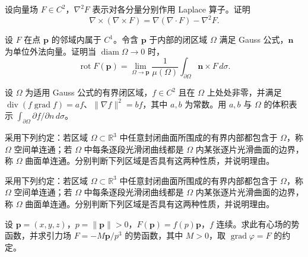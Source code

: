 \noindent\begin{minipage}{\textwidth}
设向量场 $F\in C^2$，$\nabla^2F$ 表示对各分量分别作用 Laplace 算子。证明\[\nabla\times(\nabla\times F)=\nabla(\nabla\cdot F)-\nabla^2F.\]
\end{minipage}\par\vfill
\newpage
\noindent\begin{minipage}{\textwidth}
设 $F$ 在点 $\mathbf p$ 的邻域内属于 $C^1$。令含 $\mathbf p$ 于内部的闭区域 $\Omega$ 满足 Gauss 公式，$\mathbf n$ 为单位外法向量。证明当 $\operatorname{diam}\Omega\to0$ 时，\[\operatorname{rot}F(\mathbf p)=\lim_{\Omega\to\mathbf p}\frac1{\mu(\Omega)}\int_{\partial\Omega}\mathbf n\times F\,d\sigma.\]
\end{minipage}\par\vfill
\noindent\begin{minipage}{\textwidth}
设 $\Omega$ 为适用 Gauss 公式的有界闭区域，$f\in C^2$ 且在 $\Omega$ 上处处非零，并满足 $\operatorname{div}(f\operatorname{grad}f)=af$、$\|\nabla f\|^2=bf$，其中 $a,b$ 为常数。用 $a,b$ 与 $\Omega$ 的体积表示 $\int_{\partial\Omega}\partial f/\partial n\,d\sigma$。
\end{minipage}\par\vfill
\noindent\begin{minipage}{\textwidth}
采用下列约定：若区域 $\Omega\subset\mathbb R^3$ 中任意封闭曲面所围成的有界内部都包含于 $\Omega$，称 $\Omega$ 空间单连通；若 $\Omega$ 中每条逐段光滑闭曲线都是 $\Omega$ 内某张逐片光滑曲面的边界，称 $\Omega$ 曲面单连通。分别判断下列区域是否具有这两种性质，并说明理由。
\end{minipage}\par\vfill
\newpage
\noindent\begin{minipage}{\textwidth}
采用下列约定：若区域 $\Omega\subset\mathbb R^3$ 中任意封闭曲面所围成的有界内部都包含于 $\Omega$，称 $\Omega$ 空间单连通；若 $\Omega$ 中每条逐段光滑闭曲线都是 $\Omega$ 内某张逐片光滑曲面的边界，称 $\Omega$ 曲面单连通。分别判断下列区域是否具有这两种性质，并说明理由。
\end{minipage}\par\vfill
\noindent\begin{minipage}{\textwidth}
设 $\mathbf p=(x,y,z)$，$p=\|\mathbf p\|>0$，$F(\mathbf p)=f(p)\mathbf p$，$f$ 连续。求此有心场的势函数，并求引力场 $F=-M\mathbf p/p^3$ 的势函数，其中 $M>0$，取 $\operatorname{grad}\varphi=F$ 的约定。
\end{minipage}\par\vfill

